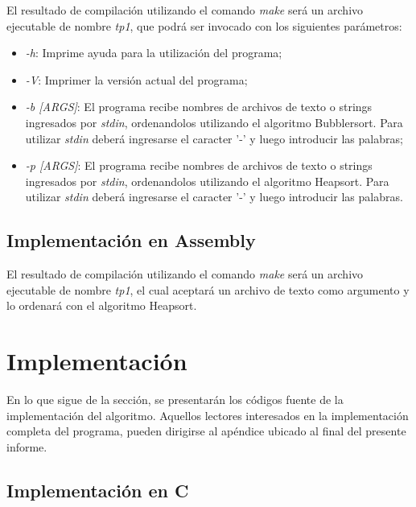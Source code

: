 \documentclass{article}
\begin{document}
	El resultado de compilación utilizando el comando \textit{make} será un archivo ejecutable de nombre \textit{tp1}, que podrá ser invocado con los siguientes parámetros:
	\medskip

	\begin{itemize}

		\itemsep=2pt \topsep=0pt \partopsep=0pt \parskip=0pt \parsep=0pt
			\item \textit{-h}:  Imprime ayuda para la utilización del programa;
			\item \textit{-V}:  Imprimer la versión actual del programa;
			\item \textit{-b [ARGS]}:  El programa recibe nombres de archivos de texto o strings ingresados por \textit{stdin}, ordenandolos utilizando el algoritmo Bubblersort. Para utilizar \textit{stdin} deberá ingresarse el caracter '-' y luego introducir las palabras;
			\item \textit{-p [ARGS]}:  El programa recibe nombres de archivos de texto o strings ingresados por \textit{stdin}, ordenandolos utilizando el algoritmo Heapsort. Para utilizar \textit{stdin} deberá ingresarse el caracter '-' y luego introducir las palabras.

	\end{itemize}	
	\medskip



\subsection{Implementación en Assembly}

	El resultado de compilación utilizando el comando \textit{make} será un archivo ejecutable de nombre \textit{tp1}, el cual aceptará un archivo de texto como argumento y lo ordenará con el algoritmo Heapsort.
\bigskip\bigskip




\section{Implementación}
	
	En lo que sigue de la sección, se presentarán los códigos fuente de la implementación del algoritmo. Aquellos lectores interesados en la implementación completa del programa, pueden dirigirse al apéndice ubicado al final del presente informe.
\bigskip



\subsection{Implementación en C}
\end{document}
